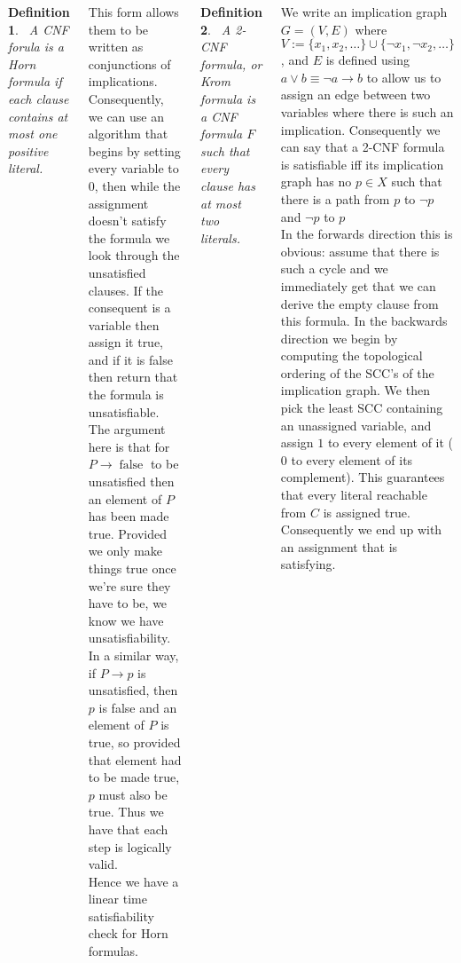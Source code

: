 \documentclass{tikzposter} %
\DeclareMathOperator{\false}{false}
\newtheorem{definition}{Definition}
\begin{document}
\begin{columns}
{  \begin{definition}
  \ A CNF forula is a Horn formula if each clause contains at most one positive literal.
  \end{definition}
  \hphantom{}

  This form allows them to be written as conjunctions of implications. Consequently, we can use an algorithm that begins by setting every variable to $0$, then while the assignment doesn't satisfy the formula we look through the unsatisfied clauses. If the consequent is a variable then assign it true, and if it is false then return that the formula is unsatisfiable. The argument here is that for $P \rightarrow \false$ to be unsatisfied then an element of $P$ has been made true. Provided we only make things true once we're sure they have to be, we know we have unsatisfiability. In a similar way, if $P \to p$ is unsatisfied, then $p$ is false and an element of $P$ is true, so provided that element had to be made true, $p$ must also be true. Thus we have that each step is logically valid. \\

  Hence we have a linear time satisfiability check for Horn formulas. \\

  \begin{definition}
  \ A 2-CNF formula, or Krom formula is a CNF formula $F$ such that every clause has at most two literals.
  \end{definition}
  \hphantom{}

  We write an implication graph $G = (V,E)$ where $V := \{x_{1}, x_{2}, \dots\} \cup \{\neg x_{1}, \neg x_{2}, \dots\}$, and $E$ is defined using $a \lor b \equiv \neg a \rightarrow b$ to allow us to assign an edge between two variables where there is such an implication. Consequently we can say that a 2-CNF formula is satisfiable iff its implication graph has no $p \in X$ such that there is a path from $p$ to $\neg p$ and $\neg p$ to $p$ \\

  In the forwards direction this is obvious: assume that there is such a cycle and we immediately get that we can derive the empty clause from this formula. In the backwards direction we begin by computing the topological ordering of the SCC's of the implication graph. We then pick the least SCC containing an unassigned variable, and assign $1$ to every element of it ($0$ to every element of its complement). This guarantees that every literal reachable from $C$ is assigned true. Consequently we end up with an assignment that is satisfying.\\

}
\end{columns}
\end{document}
